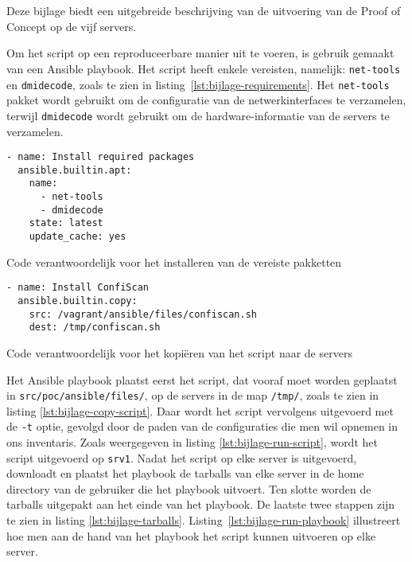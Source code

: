 
\chapter{}
\label{ch:bijlage_poc_uitvoering}

Deze bijlage biedt een uitgebreide beschrijving van de uitvoering van de Proof of Concept op de vijf servers.

Om het script op een reproduceerbare manier uit te voeren, is gebruik gemaakt van een Ansible playbook.
Het script heeft enkele vereisten, namelijk: \texttt{net-tools} en \texttt{dmidecode}, zoals te zien in listing~\ref{lst:bijlage-requirements}.
Het \texttt{net-tools} pakket wordt gebruikt om de configuratie van de netwerkinterfaces te verzamelen, terwijl \texttt{dmidecode} wordt gebruikt om de hardware-informatie van de servers te verzamelen.

\begin{listing}
  \begin{verbatim}
- name: Install required packages
  ansible.builtin.apt:
    name:
      - net-tools
      - dmidecode
    state: latest
    update_cache: yes
  \end{verbatim}
  \caption[Installatie van vereiste pakketten.]{Code verantwoordelijk voor het installeren van de vereiste pakketten}
  \label{lst:bijlage-requirements}
\end{listing}

\begin{listing}
  \begin{verbatim}
- name: Install ConfiScan
  ansible.builtin.copy:
    src: /vagrant/ansible/files/confiscan.sh
    dest: /tmp/confiscan.sh
  \end{verbatim}
  \caption[Kopi\"{e}ren van script naar servers.]{Code verantwoordelijk voor het kopiëren van het script naar de servers}
  \label{lst:bijlage-copy-script}
\end{listing}

Het Ansible playbook plaatst eerst het script, dat vooraf moet worden geplaatst in \texttt{src/poc/ansible/files/}, op de servers in de map \texttt{/tmp/}, zoals te zien in listing \ref{lst:bijlage-copy-script}.
Daar wordt het script vervolgens uitgevoerd met de \texttt{-t} optie, gevolgd door de paden van de configuraties die men wil opnemen in ons inventaris.
Zoals weergegeven in listing \ref{lst:bijlage-run-script}, wordt het script uitgevoerd op \texttt{srv1}.
Nadat het script op elke server is uitgevoerd, downloadt en plaatst het playbook de tarballs van elke server in de home directory van de gebruiker die het playbook uitvoert.
Ten slotte worden de tarballs uitgepakt aan het einde van het playbook.
De laatste twee stappen zijn te zien in listing \ref{lst:bijlage-tarballs}.
Listing~\ref{lst:bijlage-run-playbook} illustreert hoe men aan de hand van het playbook het script kunnen uitvoeren op elke server.

